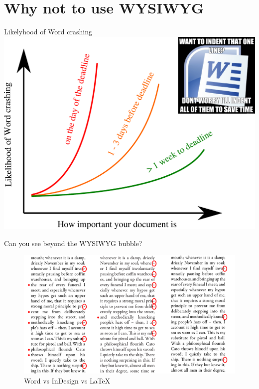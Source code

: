 \documentclass[10pt,times]{beamer}
\subtitle{\LaTeX, vector graphics, reference management and version control}
\begin{document}
\begin{frame}
  \titlepage
\end{frame}

\section{Why not to use WYSIWYG}

\begin{frame}{Likelyhood of Word crashing}
  \centering
  \includegraphics[height=0.8\textheight]{figs/word_crash}
\end{frame}

\begin{frame}{Can you see beyond the WYSIWYG bubble?}
  \begin{figure}
    \centering
    \includegraphics[width=\linewidth]{figs/LaTeX_InDesign_Word.png}
    \caption*{Word vs InDesign vs LaTeX}
\end{figure}
\end{frame}
\end{document}
